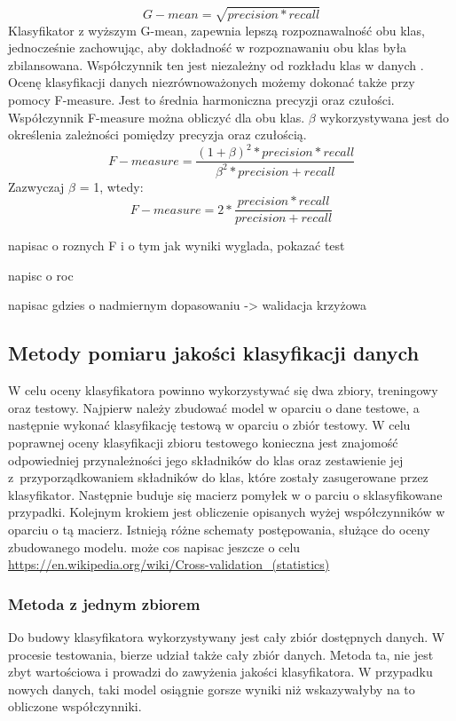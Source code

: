 \[G-mean = \sqrt{precision*recall}\]
Klasyfikator z wyższym G-mean, zapewnia lepszą rozpoznawalność obu klas, jednocześnie zachowując, aby dokładność w rozpoznawaniu obu klas była zbilansowana. Współczynnik ten jest niezależny od rozkładu klas w danych \cite{Garcia}.
\\
Ocenę klasyfikacji danych niezrównoważonych możemy dokonać także przy pomocy F-measure. Jest to średnia harmoniczna precyzji oraz czułości. Współczynnik F-measure można obliczyć dla obu klas. $\beta$ wykorzystywana jest do określenia zależności pomiędzy precyzja oraz czułością.
\[F-measure= \frac{(1+\beta)^2*precision*recall}{\beta^2*precision+recall}\]
Zazwyczaj $\beta$ = 1, wtedy:
\[F-measure= 2*\frac{precision*recall}{precision+recall}\]

 napisac o roznych F i o tym jak wyniki wyglada, pokazać test

 napisc o roc

 napisac gdzies o nadmiernym dopasowaniu -> walidacja krzyżowa
\subsection{Metody pomiaru jakości klasyfikacji danych}
W celu oceny klasyfikatora powinno wykorzystywać się dwa zbiory, treningowy oraz testowy. Najpierw należy zbudować model w oparciu o dane testowe, a następnie wykonać klasyfikację testową w oparciu o zbiór testowy. W celu poprawnej oceny klasyfikacji zbioru testowego konieczna jest znajomość odpowiedniej przynależności jego składników do klas oraz zestawienie jej z przyporządkowaniem składników do klas, które zostały zasugerowane przez klasyfikator. Następnie buduje się macierz pomyłek w o parciu o sklasyfikowane przypadki. Kolejnym krokiem jest obliczenie opisanych wyżej współczynników w oparciu o tą macierz. Istnieją różne schematy postępowania, służące do oceny zbudowanego modelu.
 może cos napisac jeszcze o celu \url{https://en.wikipedia.org/wiki/Cross-validation_(statistics)} 
\subsubsection{Metoda z jednym zbiorem}
Do budowy klasyfikatora wykorzystywany jest cały zbiór dostępnych danych. W procesie testowania, bierze udział także cały zbiór danych. Metoda ta, nie jest zbyt wartościowa i prowadzi do zawyżenia jakości klasyfikatora. W przypadku nowych danych, taki model osiągnie gorsze wyniki niż wskazywałyby na to obliczone współczynniki.
